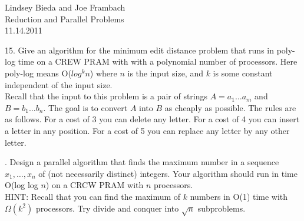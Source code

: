 \documentclass[10pt]{article}
\begin{document}
	\begin{flushright}
	Lindsey Bieda and Joe Frambach\\
	Reduction and Parallel Problems\\
	11.14.2011
	\end{flushright}

15. Give an algorithm for the minimum edit distance problem that runs in poly-log time on a CREW
PRAM with with a polynomial number of processors. Here poly-log means O($log^k n$) where $n$ is the
input size, and $k$ is some constant independent of the input size.\\
Recall that the input to this problem is a pair of strings $A = a_1 \ldots a_m$ and $B = b_1 \ldots b_n$. The goal is
to convert $A$ into $B$ as cheaply as possible. The rules are as follows. For a cost of 3 you can delete any
letter. For a cost of 4 you can insert a letter in any position. For a cost of 5 you can replace any letter
by any other letter.

. Design a parallel algorithm that finds the maximum number in a sequence $x_1, \ldots , x_n$ of (not necessarily
distinct) integers. Your algorithm should run in time O(log log $n$) on a CRCW PRAM with $n$ processors.\\
HINT: Recall that you can find the maximum of $k$ numbers in O(1) time with 
$\Omega(k^2)$ processors. Try divide and conquer into $\sqrt{n}$ subproblems.
\end{document}

